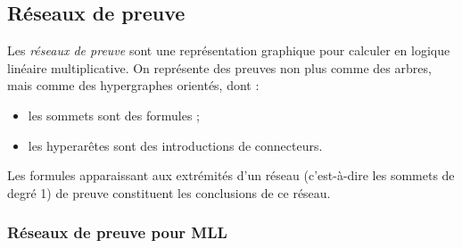 \documentclass[a4paper, 11pt]{article}
\begin{document}
\subsection{Réseaux de preuve}

Les \emph{réseaux de preuve} sont une représentation graphique pour calculer en logique linéaire multiplicative. On représente des preuves non plus comme des arbres, mais comme des hypergraphes orientés, dont :
\begin{itemize}
\item les sommets sont des formules ;
\item les hyperarêtes sont des introductions de connecteurs.
\end{itemize}
Les formules apparaissant aux extrémités d'un réseau (c'est-à-dire les sommets de degré 1) de preuve constituent les conclusions de ce réseau.

\subsubsection{Réseaux de preuve pour MLL}
\end{document}
